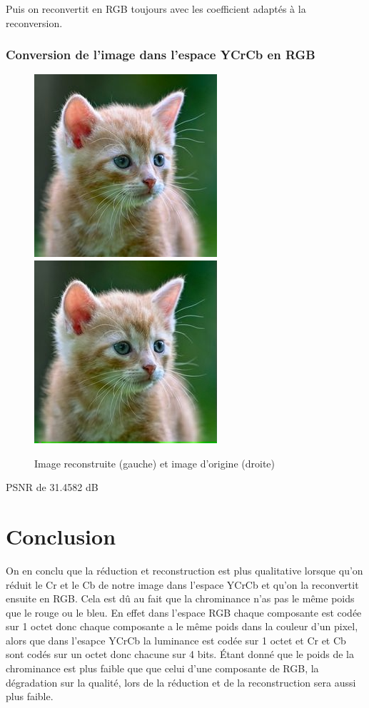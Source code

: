 \documentclass{article}
\begin{document}
Puis on reconvertit en RGB toujours avec les coefficient adaptés à la reconversion.

\newpage
\subsubsection*{Conversion de l'image dans l'espace YCrCb en RGB}
\begin{figure}[h]
\centerline{\includegraphics[scale=0.9]{./rendus/Chalex.png} \includegraphics[scale=0.9]{./rendus/ChalexYCrCbReduit.png} }
\caption{Image reconstruite (gauche) et image d'origine (droite) }
\end{figure}


PSNR de 31.4582 dB


\section*{Conclusion}

On en conclu que la réduction et reconstruction est plus qualitative lorsque qu'on réduit le Cr et le Cb de notre image dans l'espace YCrCb et qu'on la reconvertit ensuite en RGB.
Cela est dû au fait que la chrominance n'as pas le même poids que le rouge ou le bleu.
En effet dans l'espace RGB chaque composante est codée sur 1 octet donc chaque composante a le même poids dans la couleur d'un pixel, alors que dans l'esapce YCrCb la luminance est codée sur 1 octet et Cr et Cb sont codés sur un octet donc chacune sur 4 bits.
Étant donné que le poids de la chrominance est plus faible que que celui d'une composante de RGB, la dégradation sur la qualité, lors de la réduction et de la reconstruction sera aussi plus faible.
\\\\
\end{document}
